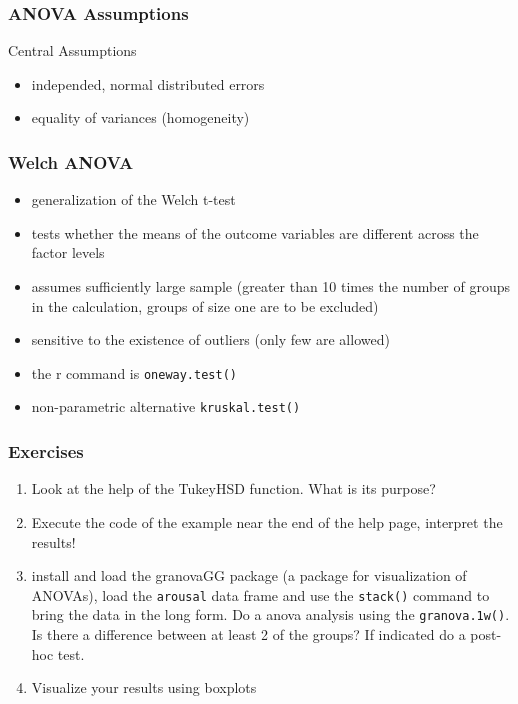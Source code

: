 \begin{frame}\frametitle{ANOVA Assumptions}
  \begin{alertblock}{Central Assumptions}
  \begin{itemize}
  \item independed, normal distributed errors
  \item equality of variances (homogeneity)
  \end{itemize}
  \end{alertblock}
\end{frame}


\begin{frame}[allowframebreaks]\frametitle{Welch ANOVA}
\begin{itemize}
\item generalization of the Welch t-test
\item tests whether the means of the outcome variables are different across the factor levels
\item assumes sufficiently large sample (greater than 10 times the number of groups in the calculation, groups of size one are to be excluded)
\item sensitive to the existence of outliers (only few are allowed)
\item the r command is \texttt{oneway.test()}
\item non-parametric alternative \texttt{kruskal.test()}
\end{itemize}
\end{frame}


\begin{frame}\frametitle{Exercises}
  \begin{enumerate}
  \item Look at the help of the TukeyHSD function. What is its purpose? 
  \item Execute the code of the example near the end of the help page, interpret the results!
  \item install and load the granovaGG package (a package for visualization of ANOVAs), load the \texttt{arousal} data frame and use the \texttt{stack()} command to bring the data in the long form. Do a anova analysis using the \texttt{granova.1w()}. Is there a difference between at least 2 of the groups? If indicated do a post-hoc test.
  \item Visualize your results using boxplots
  \end{enumerate}
\end{frame}



